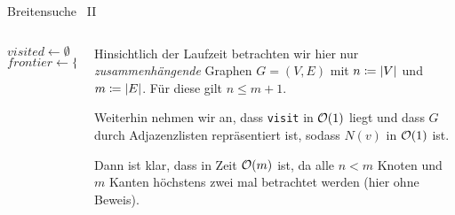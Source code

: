 \begin{frame}{Breitensuche \, II}
\begin{columns}[T]
\begin{column}{0.45\textwidth}
\vspace*{-5pt}
\addtocounter{algocf}{-1}
\begin{algorithm}[H]
	\caption{Breitensuche (BFS)}
	\DontPrintSemicolon
    $visited \gets \emptyset$\;
    $frontier \gets \{ p \}$\;
\end{algorithm}
\end{column}
\begin{column}{0.5\textwidth}
Hinsichtlich der Laufzeit betrachten wir hier nur \emph{zusammenh\"angende} Graphen $G = (V, E)$ mit $n \coloneqq \vert V\vert$ und $m \coloneqq \vert E\vert$.
F\"ur diese gilt $n \leq m + 1$.

\medskip

Weiterhin nehmen wir an, dass \texttt{visit} in $\mathcal{O}(1)$ liegt und dass $G$ durch Adjazenzlisten repr\"asentiert ist, sodass $N(v)$ in $\mathcal{O}(1)$ ist.

\medskip

Dann ist klar, dass  in Zeit $\mathcal{O}(m)$ ist, da alle $n < m$ Knoten und $m$ Kanten h\"ochstens zwei mal betrachtet werden (hier ohne Beweis).
\end{column}
\end{columns}
\end{frame}


